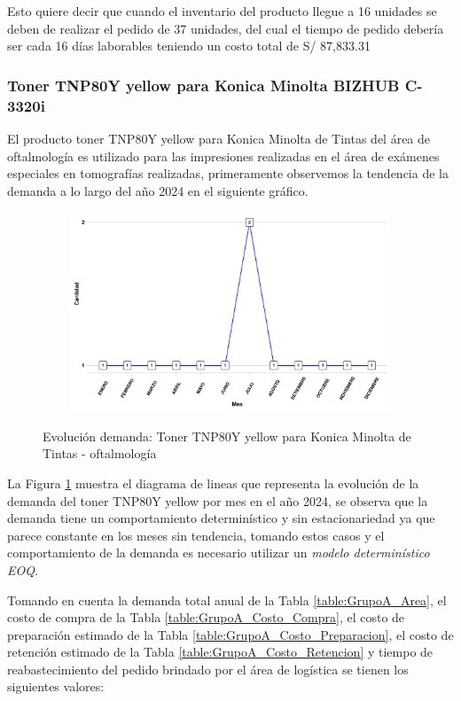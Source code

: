 Esto quiere decir que cuando el inventario del producto llegue a 16 unidades se deben de realizar el pedido de 37 unidades, del cual el tiempo de pedido debería ser cada 16 días laborables teniendo un costo total de S/ 87,833.31
\subsubsection{Toner TNP80Y yellow para Konica Minolta BIZHUB C-3320i}
El producto toner TNP80Y yellow para Konica Minolta de Tintas del área de oftalmología es utilizado para las impresiones realizadas en el área de exámenes especiales en tomografías realizadas, primeramente observemos la tendencia de la demanda a lo largo del año 2024 en el siguiente gráfico.
\clearpage
\begin{figure}[H]
  \caption{Evolución demanda: Toner TNP80Y yellow para Konica Minolta de Tintas - oftalmología}
  {\includegraphics[width=15cm, height=5.95cm]{images/PROD010_demanda.pdf}}
  \label{fig:PROD010_demanda}
\end{figure}

La Figura \ref{fig:PROD010_demanda} muestra el diagrama de lineas que representa la evolución de la demanda del toner TNP80Y yellow por mes en el año 2024, se observa que la demanda tiene un comportamiento determinístico y sin estacionariedad ya que parece constante en los meses sin tendencia, tomando estos casos y el comportamiento de la demanda es necesario utilizar un \textsl{modelo determinístico EOQ}.

Tomando en cuenta la demanda total anual de la Tabla \ref{table:GrupoA_Area}, el costo de compra de la Tabla \ref{table:GrupoA_Costo_Compra}, el costo de preparación estimado de la Tabla \ref{table:GrupoA_Costo_Preparacion}, el costo de retención estimado de la Tabla \ref{table:GrupoA_Costo_Retencion} y tiempo de reabastecimiento del pedido brindado por el área de logística se tienen los siguientes valores:

